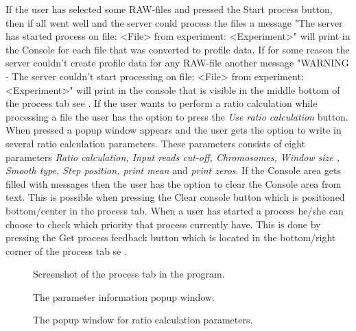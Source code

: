If the user has selected some RAW-files and pressed the Start process button, then if all went well and the server could process the files a message "The server has started process on file: <File> from experiment: <Experiment>" will print in the Console for each file that was converted to profile data. If for some reason the server couldn't create profile data for any RAW-file another message "WARNING - The server couldn't start processing on file: <File> from experiment: <Experiment>" will print in the console that is visible in the middle bottom of the process tab see . If the user wants to perform a ratio calculation while processing a file the user has the option to press the \emph{Use ratio calculation} button. When pressed a popup window appears and the user gets the option to write in several ratio calculation parameters. These parameters consists of eight parameters \emph{Ratio calculation, Input reads cut-off, Chromosomes, Window size , Smooth type, Step position, print mean} and  \emph{print zeros}. If the Console area gets filled with messages then the user has the option to clear the Console area from text. This is possible when pressing the Clear console button which is positioned bottom/center in the process tab. When a user has started a process he/she can choose to check which priority that process currently have. This is done by pressing the Get process feedback button which is located in the bottom/right corner of the process tab se .




\begin{figure}[htb]
	\caption{Screenshot of the process tab in the program.}
	\label{fig:des_process-view}
\end{figure}

\begin{figure}[htb]
	\caption{The parameter information popup window.}
	\label{fig:des_process-view-info}
\end{figure}

\begin{figure}[htb]
	\caption{The popup window for ratio calculation parameters.}
	\label{fig:des_process-view-ratio}
\end{figure}

\FloatBarrier

